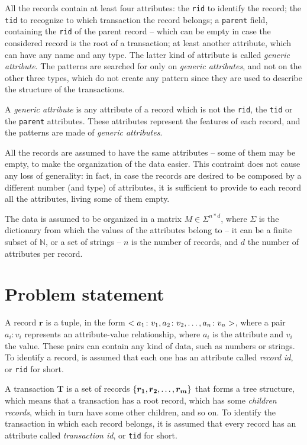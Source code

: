 \documentclass{acm_proc_article-sp-sigmod09}
\begin{document}
All the records contain at least four attributes: the \texttt{rid} to identify the record; the \texttt{tid} to recognize to which transaction the record belongs; a \texttt{parent} field, containing the \texttt{rid} of the parent record -- which can be empty in case the considered record is the root of a transaction; at least another attribute, which can have any name and any type. The latter kind of attribute is called \emph{generic attribute}. The patterns are searched for only on \emph{generic attributes}, and not on the other three types, which do not create any pattern since they are used to describe the structure of the transactions.

\begin{definition}
A \emph{generic attribute} is any attribute of a record which is not the \texttt{rid}, the \texttt{tid} or the \texttt{parent} attributes. These attributes represent the features of each record, and the patterns are made of \emph{generic attributes}.
\end{definition}

All the records are assumed to have the same attributes -- some of them may be empty, to make the organization of the data easier. This contraint does not cause any loss of generality: in fact, in case the records are desired to be composed by a different number (and type) of attributes, it is sufficient to provide to each record all the attributes, living some of them empty.

The data is assumed to be organized in a matrix $M \in \Sigma^{n * d}$, where $\Sigma$ is the dictionary from which the values of the attributes belong to -- it can be a finite subset of $\mathbb{N}$, or a set of strings -- $n$ is the number of records, and $d$ the number of attributes per record.

\section{Problem statement}
A record $\boldsymbol{r}$ is a tuple, in the form $<a_1 \colon v_1, a_2 \colon v_2, \text{\dots}, a_n \colon v_n>$, where a pair $a_i \colon v_i$ represents an attribute-value relationship, where $a_i$ is the attribute and $v_i$ the value. These pairs can contain any kind of data, such as numbers or strings. To identify a record, is assumed that each one has an attribute called \emph{record id}, or \texttt{rid} for short.

A transaction $\boldsymbol{T}$ is a set of records $\{\boldsymbol{r_1}, \boldsymbol{r_2}, \text{\dots}, \boldsymbol{r_m}\}$ that forms a tree structure, which means that a transaction has a root record, which has some \emph{children records}, which in turn have some other children, and so on. To identify the transaction in which each record belongs, it is assumed that every record has an attribute called \emph{transaction id}, or \texttt{tid} for short.
\end{document}
